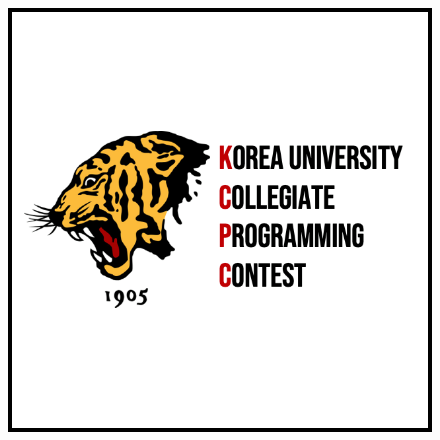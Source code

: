 \documentclass[11pt,a4paper,oneside,korean]{article}
\begin{document}

    
    \begin{figure}[h]
        \centering
        \includegraphics[height=0.2\textheight]{./problems/KCPC_logo.png}
    \end{figure}
    
    
\end{document}
